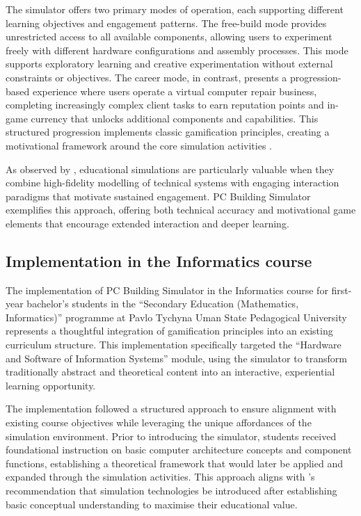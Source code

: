\documentclass[cte]{acnsart}
\begin{document}
The simulator offers two primary modes of operation, each supporting different learning objectives and engagement patterns. The free-build mode provides unrestricted access to all available components, allowing users to experiment freely with different hardware configurations and assembly processes. This mode supports exploratory learning and creative experimentation without external constraints or objectives. The career mode, in contrast, presents a progression-based experience where users operate a virtual computer repair business, completing increasingly complex client tasks to earn reputation points and in-game currency that unlocks additional components and capabilities. This structured progression implements classic gamification principles, creating a motivational framework around the core simulation activities \cite{Alexov2023}.

As observed by \citet{Wang2016319}, educational simulations are particularly valuable when they combine high-fidelity modelling of technical systems with engaging interaction paradigms that motivate sustained engagement. PC Building Simulator exemplifies this approach, offering both technical accuracy and motivational game elements that encourage extended interaction and deeper learning.

\subsection{Implementation in the Informatics course}

The implementation of PC Building Simulator in the Informatics course for first-year bachelor's students in the ``Secondary Education (Mathematics, Informatics)'' programme at Pavlo Tychyna Uman State Pedagogical University represents a thoughtful integration of gamification principles into an existing curriculum structure. This implementation specifically targeted the ``Hardware and Software of Information Systems'' module, using the simulator to transform traditionally abstract and theoretical content into an interactive, experiential learning opportunity.

The implementation followed a structured approach to ensure alignment with existing course objectives while leveraging the unique affordances of the simulation environment. Prior to introducing the simulator, students received foundational instruction on basic computer architecture concepts and component functions, establishing a theoretical framework that would later be applied and expanded through the simulation activities. This approach aligns with \citet{Zweifel20171103}'s recommendation that simulation technologies be introduced after establishing basic conceptual understanding to maximise their educational value.
\end{document}
